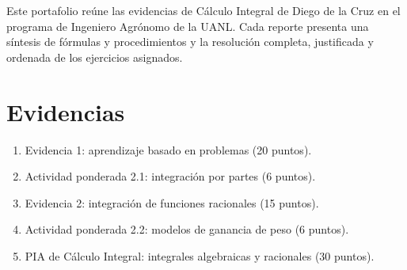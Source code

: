 \documentclass[spanish,letterpaper,oneside]{article}
\begin{document}
\templatePortrait
\templatePagecfg
\onehalfspacing

\begin{abstractd}
Este portafolio reúne las evidencias de Cálculo Integral de Diego de la Cruz en el programa de Ingeniero Agrónomo de la UANL. Cada reporte presenta una síntesis de fórmulas y procedimientos y la resolución completa, justificada y ordenada de los ejercicios asignados.
\end{abstractd}

\templateIndex
\templateFinalcfg

\section{Evidencias}
\begin{enumerate}
  \item Evidencia 1: aprendizaje basado en problemas (20 puntos).
  \item Actividad ponderada 2.1: integración por partes (6 puntos).
  \item Evidencia 2: integración de funciones racionales (15 puntos).
  \item Actividad ponderada 2.2: modelos de ganancia de peso (6 puntos).
  \item PIA de Cálculo Integral: integrales algebraicas y racionales (30 puntos).
\end{enumerate}

\nocite{*}

\end{document}
